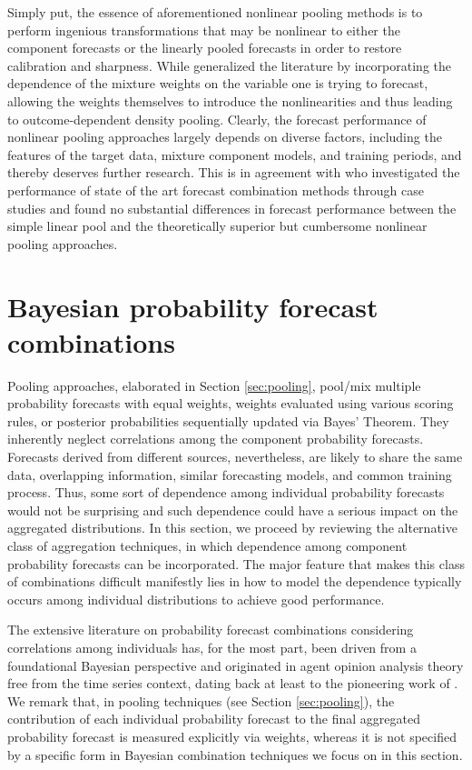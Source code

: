 \documentclass[11pt]{article}
\begin{document}
Simply put, the essence of aforementioned nonlinear pooling methods is to perform ingenious transformations that may be nonlinear to either the component forecasts or the linearly pooled forecasts in order to restore calibration and sharpness. While \citet{Kapetanios2015-bb} generalized the literature by incorporating the dependence of the mixture weights on the variable one is trying to forecast, allowing the weights themselves to introduce the nonlinearities and thus leading to outcome-dependent density pooling. Clearly, the forecast performance of nonlinear pooling approaches largely depends on diverse factors, including the features of the target data, mixture component models, and training periods, and thereby deserves further research. This is in agreement with \citet{Baran2018-nm} who investigated the performance of state of the art forecast combination methods through case studies and found no substantial differences in forecast performance between the simple linear pool and the theoretically superior but cumbersome nonlinear pooling approaches.


\section{Bayesian probability forecast combinations}
\label{sec:bayesian_comb}

Pooling approaches, elaborated in Section \ref{sec:pooling}, pool/mix multiple probability forecasts with equal weights, weights evaluated using various scoring rules, or posterior probabilities sequentially updated via Bayes' Theorem. They inherently neglect correlations among the component probability forecasts. Forecasts derived from different sources, nevertheless, are likely to share the same data, overlapping information, similar forecasting models, and common training process. Thus, some sort of dependence among individual probability forecasts would not be surprising and such dependence could have a serious impact on the aggregated distributions. In this section, we proceed by reviewing the alternative class of aggregation techniques, in which dependence among component probability forecasts can be incorporated. The major feature that makes this class of combinations difficult manifestly lies in how to model the dependence typically occurs among individual distributions to achieve good performance.

The extensive literature on probability forecast combinations considering correlations among individuals has, for the most part, been driven from a foundational Bayesian perspective and originated in agent opinion analysis theory free from the time series context, dating back at least to the pioneering work of \citet{Winkler1968-uw}. We remark that, in pooling techniques (see Section \ref{sec:pooling}), the contribution of each individual probability forecast to the final aggregated probability forecast is measured explicitly via weights, whereas it is not specified by a specific form in Bayesian combination techniques we focus on in this section.
\end{document}
